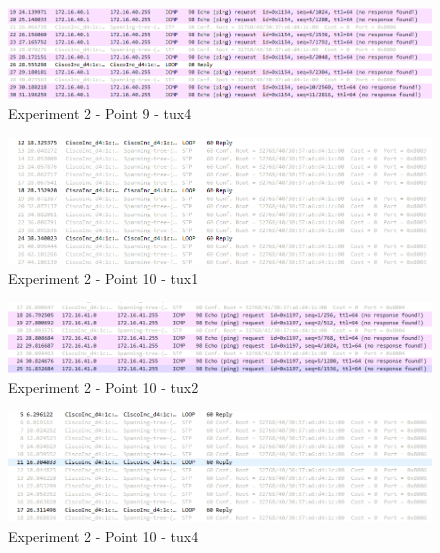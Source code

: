 \documentclass[a4paper]{article}
\begin{document}
	\begin{figure}[H]
	\begin{center}
  	\includegraphics[width=\linewidth]{exp2_9_tux4.png}
  	\caption{Experiment 2 - Point 9 - tux4}
  	\label{fig:Experiment 2 - Point 9 - tux4}
	\end{center}
	\end{figure}

		\begin{figure}[H]
	\begin{center}
  	\includegraphics[width=\linewidth]{exp2_10_tux1.png}
  	\caption{Experiment 2 - Point 10 - tux1}
  	\label{fig:Experiment 2 - Point 10 - tux1}
	\end{center}
	\end{figure}

	\begin{figure}[H]
	\begin{center}
  	\includegraphics[width=\linewidth]{exp2_10_tux2.png}
  	\caption{Experiment 2 - Point 10 - tux2}
  	\label{fig:Experiment 2 - Point 10 - tux2}
	\end{center}
	\end{figure}

	\begin{figure}[H]
	\begin{center}
  	\includegraphics[width=\linewidth]{exp2_10_tux4.png}
  	\caption{Experiment 2 - Point 10 - tux4}
  	\label{fig:Experiment 2 - Point 10 - tux4}
	\end{center}
	\end{figure}
\end{document}
